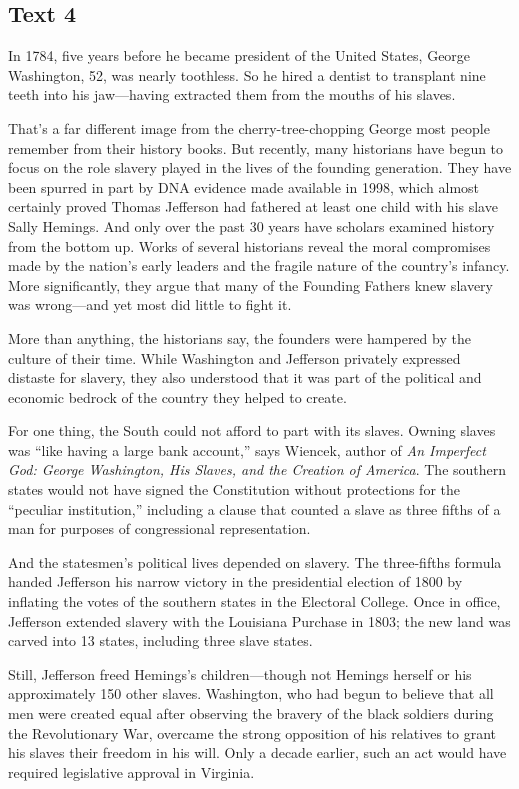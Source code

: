 \newpage
\subsection{Text 4}


In 1784, five years before he became president of the United States,
George Washington, 52, was nearly toothless. So he hired a dentist to
transplant nine teeth into his jaw---having extracted them from the
mouths of his slaves.

That's a far different image from the cherry-tree-chopping George most
people remember from their history books. But recently, many historians
have begun to focus on the role slavery played in the lives of the
founding generation. They have been spurred in part by DNA evidence made
available in 1998, which almost certainly proved Thomas Jefferson had
fathered at least one child with his slave Sally Hemings. And only over
the past 30 years have scholars examined history from the bottom up.
Works of several historians reveal the moral compromises made by the
nation's early leaders and the fragile nature of the country's infancy.
More significantly, they argue that many of the Founding Fathers knew
slavery was wrong---and yet most did little to fight it.

More than anything, the historians say, the founders were hampered by
the culture of their time. While Washington and Jefferson privately
expressed distaste for slavery, they also understood that it was part of
the political and economic bedrock of the country they helped to create.

For one thing, the South could not afford to part with its slaves.
Owning slaves was ``like having a large bank account,'' says Wiencek,
author of \emph{An Imperfect God: George Washington, His Slaves, and the
Creation of America}. The southern states would not have signed the
Constitution without protections for the ``peculiar institution,''
including a clause that counted a slave as three fifths of a man for
purposes of congressional representation.

And the statesmen's political lives depended on slavery. The
three-fifths formula handed Jefferson his narrow victory in the
presidential election of 1800 by inflating the votes of the southern
states in the Electoral College. Once in office, Jefferson extended
slavery with the Louisiana Purchase in 1803; the new land was carved
into 13 states, including three slave states.

Still, Jefferson freed Hemings's children---though not Hemings herself
or his approximately 150 other slaves. Washington, who had begun to
believe that all men were created equal after observing the
bravery of the black soldiers during the Revolutionary War, overcame the
strong opposition of his relatives to grant his slaves their freedom in
his will. Only a decade earlier, such an act would have required
legislative approval in Virginia.


